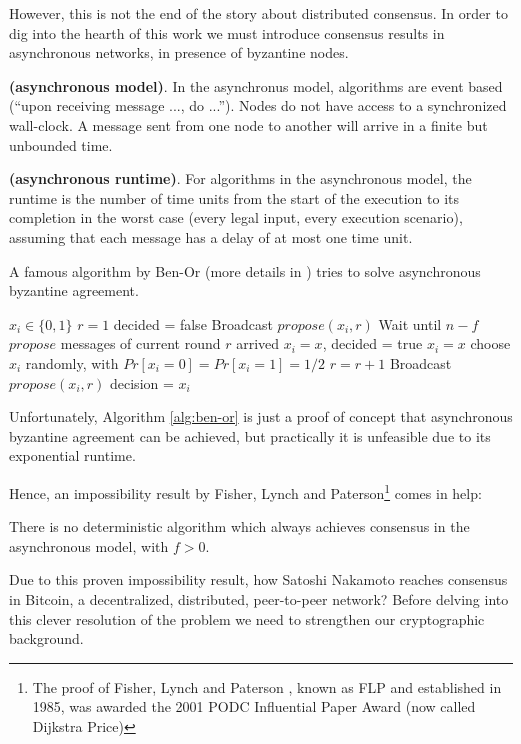 \bigskip
\noindent
However, this is not the end of the story about distributed consensus. In order to dig into the hearth of this work we must introduce consensus results in asynchronous networks, in presence of byzantine nodes.
\begin{mydef}{\bf (asynchronous model)}.
    In the asynchronus model, algorithms are event based (\enquote{upon receiving message ..., do ...}). Nodes do not have access to a synchronized wall-clock. A message sent from one node to another will arrive in a finite but unbounded time.
\end{mydef}
\begin{mydef}{\bf (asynchronous runtime)}.
    For algorithms in the asynchronous model, the runtime is the number of time units from the start of the execution to its completion in the worst case (every legal input, every execution scenario), assuming that each message has a delay of at most one time unit.    
\end{mydef}

\bigskip
\noindent
A famous algorithm by Ben-Or (more details in \cite{Ben-Or:1983:AFC:800221.806707}) tries to solve asynchronous byzantine agreement.

\bigskip
\begin{algorithm}
	\caption{Asynchronous Byzantine Agreement (Ben-Or, for $f < n/9$)}
	\label{alg:ben-or}
	\begin{algorithmic}[1]
		\State $x_{i} \in \{0,1\}$ 
		\State $r=1$ 
		\State decided = false
		\State Broadcast $propose(x_{i},r)$
		\Repeat
		\State Wait until $n-f$ $propose$ messages of current round $r$ arrived
		\State $x_{i}=x$, decided = true
		\State $x_{i}=x$
		\Else
		\State choose $x_{i}$ randomly, with $Pr[x_{i}=0] = Pr[x_{i}=1] = 1/2$
		\EndIf
		\State $r=r+1$
		\State Broadcast $propose(x_{i},r)$
		\State decision = $x_{i}$
	\end{algorithmic}
\end{algorithm}

\bigskip
\noindent
Unfortunately, Algorithm \ref{alg:ben-or} is just a proof of concept that asynchronous byzantine agreement can be achieved, but practically it is unfeasible due to its exponential runtime.

\bigskip
\noindent
Hence, an impossibility result by Fisher, Lynch and Paterson\footnote{The proof of Fisher, Lynch and Paterson \cite{Fischer:1985:IDC:3149.214121}, known as FLP and established in 1985, was awarded the 2001 PODC Influential Paper Award (now called Dijkstra Price)} comes in help:
\begin{thm}
    There is no deterministic algorithm which always achieves consensus in the asynchronous model, with $f>0$.
\end{thm}

\bigskip
\noindent
Due to this proven impossibility result, how Satoshi Nakamoto reaches consensus in Bitcoin, a decentralized, distributed, peer-to-peer network? Before delving into this clever resolution of the problem we need to strengthen our cryptographic background.